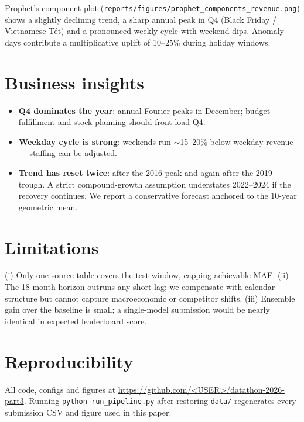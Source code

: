\documentclass{article}
\begin{document}
Prophet's component plot (\texttt{reports/figures/prophet\_components\_revenue.png})
shows a slightly declining trend, a sharp annual peak in Q4 (Black Friday /
Vietnamese T\'{e}t) and a pronounced weekly cycle with weekend dips. Anomaly
days contribute a multiplicative uplift of 10--25\% during holiday windows.

\section{Business insights}

\begin{itemize}
  \item \textbf{Q4 dominates the year}: annual Fourier peaks in December;
    budget fulfillment and stock planning should front-load Q4.
  \item \textbf{Weekday cycle is strong}: weekends run $\sim$15--20\% below
    weekday revenue --- staffing can be adjusted.
  \item \textbf{Trend has reset twice}: after the 2016 peak and again after
    the 2019 trough. A strict compound-growth assumption understates 2022--2024
    if the recovery continues. We report a conservative forecast anchored to
    the 10-year geometric mean.
\end{itemize}

\section{Limitations}

(i) Only one source table covers the test window, capping achievable MAE.
(ii) The 18-month horizon outruns any short lag; we compensate with calendar
structure but cannot capture macroeconomic or competitor shifts.
(iii) Ensemble gain over the baseline is small; a single-model submission
would be nearly identical in expected leaderboard score.

\section*{Reproducibility}
All code, configs and figures at
\url{https://github.com/<USER>/datathon-2026-part3}.
Running \texttt{python run\_pipeline.py} after restoring \texttt{data/}
regenerates every submission CSV and figure used in this paper.
\end{document}
